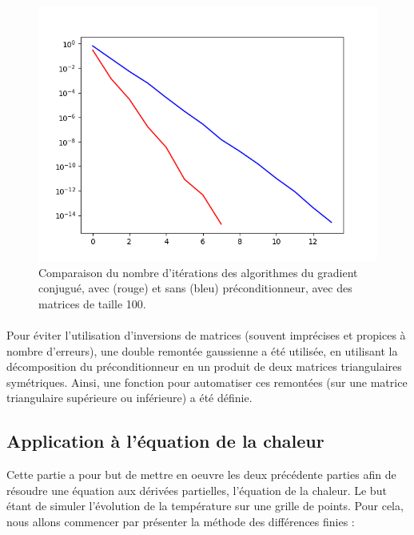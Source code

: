 \documentclass{article}
\begin{document}
\begin{figure}[ht]
    \centering
    \includegraphics[width=0.7\columnwidth]{conjgrad_comp.png}
    \caption{Comparaison du nombre d'itérations des algorithmes du gradient conjugué, avec (rouge) et sans (bleu) préconditionneur, avec des matrices de taille 100.}
    \label{fig:conj_precond}
\end{figure}

\paragraph{}
    Pour éviter l'utilisation d'inversions de matrices (souvent imprécises et propices à nombre d'erreurs), une double remontée gaussienne a été utilisée, en utilisant la décomposition du préconditionneur en un produit de deux matrices triangulaires symétriques. Ainsi, une fonction pour automatiser ces remontées (sur une matrice triangulaire supérieure ou inférieure) a été définie.
    
    
\subsection*{Application à l’équation de la chaleur}
    Cette partie a pour but de mettre en oeuvre les deux précédente parties 
    afin de résoudre une équation aux dérivées partielles, l'équation de la chaleur. 
    Le but étant de simuler l'évolution de la température sur une grille de points. Pour cela, nous allons commencer par présenter la méthode des différences finies : 
\end{document}
